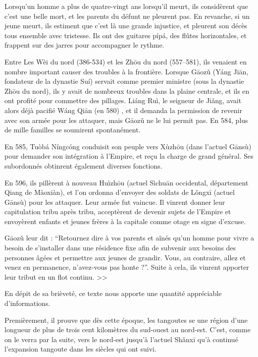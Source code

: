 \documentclass[oldfontcommands,oneside,a4paper,11pt]{memoir}
\newcommand{\ipapl}[1]{{\phondroit #1}}
\newcommand{\ah}{\v{a}}
\newcommand{\oh}{\v{o}}
\newcommand{\uh}{\v{u}}
\begin{document}
Lorsqu'un homme a plus de quatre-vingt ans lorsqu'il meurt, ils considèrent que c'est une belle mort, et les parents du défunt ne pleurent pas. En revanche, si un jeune meurt, ils estiment que c'est là une grande injustice, et pleurent son décès tous ensemble avec tristesse. Ils ont des guitares pípá, des flûtes horizontales, et frappent sur des jarres pour accompagner le rythme. 

Entre Les Wèi du nord (386-534) et les Zhōu du nord (557–581), ils venaient en nombre important causer des troubles à la frontière. Lorsque Gāoz\uh{} (Yáng Jiān, fondateur de la dynastie Suí) servait comme premier ministre (sous la dynastie Zhōu du nord),  ils y avait de nombreux troubles dans la plaine centrale, et ils en ont profité pour commettre des pillages. Liáng Ruì, le seigneur de Ji\ah{}ng, avait alors déjà pacifié Wáng Qiān (en 580) , et il demanda la permission de revenir avec son armée pour les attaquer, mais Gāoz\uh{} ne le lui permit pas. En 584, plus de mille familles se soumirent spontanément. 

En 585, Tuòbá Níngcóng conduisit son peuple vers Xùzhōu (dans l'actuel Gānsù) pour demander son intégration à l'Empire, et reçu la charge de grand général. Ses subordonnés obtinrent également diverses fonctions. 

En 596, ils pillèrent à nouveau Huìzhōu (actuel Sìchuān occidental, département Qiang de Màoxiàn), et l'on ordonna d'envoyer des soldats de L\oh{}ngxī (actuel Gānsù) pour les attaquer. Leur armée fut vaincue. Il vinrent donner leur capitulation tribu après tribu, acceptèrent de devenir sujets de l'Empire et envoyèrent enfants et jeunes frères à la capitale comme otage en signe d'excuse. 


Gāoz\uh{} leur dit : ``Retournez dire à vos parents et aînés qu'un homme pour vivre a besoin de s'installer dans une résidence fixe afin de subvenir aux besoins des personnes âgées et permettre aux jeunes de grandir. Vous, au contraire, allez et venez en permanence, n'avez-vous pas honte ?''. Suite à cela, ils vinrent apporter leur tribut en un flot continu. >>


En dépit de sa brièveté, ce texte nous apporte une quantité appréciable d'informations.

Premièrement, il prouve que dès cette époque, les tangoutes  se  une région d'une longueur de plus de trois cent kilomètres du sud-ouest au nord-est. C'est, comme on le verra par la suite, vers le nord-est jusqu'à l'actuel Sh\ipapl{ǎ}nxī qu'à continué l'expansion tangoute dans les siècles qui ont suivi. 
\end{document}
